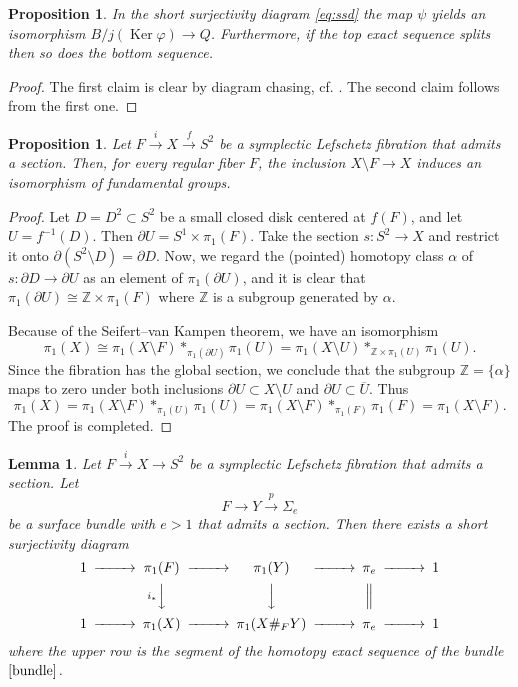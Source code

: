 \documentclass[12pt]{amsart}
\newcommand{\B}[1]{{\mathbb #1}}
\newcommand{\Z}{\B Z}
\newtheorem{lemma}[subsection]{Lemma}
\newtheorem{prop}[subsection]{Proposition}
\theoremstyle{definition}
\theoremstyle{remark}
\numberwithin{figure}{section}
\numberwithin{table}{section}
\numberwithin{equation}{section}
\newcommand{\Si}{{\Sigma}}
\newcommand{\gf}{\varphi}
\newcommand{\map}[1]{\stackrel {#1}\longrightarrow}
\newcommand\Ker{\operatorname{Ker}}
\begin{document}
\begin{prop}\label{p:ssd}
In the short surjectivity diagram \eqref{eq:ssd} the map $\psi$ yields an 
isomorphism $B/j(\Ker \gf)\to Q$. Furthermore, if the top exact sequence splits 
then so does the bottom sequence.
\end{prop}


\begin{proof} The first claim is clear by diagram chasing, cf. \cite[Lemma II.3.2]{M}. The 
second claim follows from the first one.
\end{proof}

\begin{prop}\label{p:circle}
Let $F\map{i} X \map{f} S^2$ be a symplectic Lefschetz fibration that admits a section. Then, for 
every regular fiber $F$, the inclusion $X\setminus F \to X$ induces an isomorphism of 
fundamental groups.  
\end{prop}

\begin{proof}
Let $D=D^2\subset S^2$ be a small closed disk centered at $f(F)$, and let 
$U=f^{-1}(D)$. Then $\partial U= S^1\times \pi_1(F)$. Take the section $s: S^2 \to X$ and restrict 
it onto $\partial (S^2\setminus D)=\partial D$. Now, we regard the (pointed) 
homotopy class $\alpha$ of $s: \partial D \to \partial U$ as an element of $\pi_1(\partial U)$, 
and it is clear that $\pi_1(\partial U)\cong \Z \times \pi_1(F)$ where $\Z$ is a subgroup 
generated by $\alpha$. 

Because of the Seifert--van Kampen theorem, we have an isomorphism
\[
\pi_1(X) \cong\pi_1(X\setminus F)*_{\pi_1(\partial U)}\pi_1(U)= \pi_1(X\setminus 
U)*_{\Z \times \pi_1(U)}\pi_1(U).
\]
Since the fibration has the global section, we conclude that the subgroup $\Z=\{\alpha\}$ maps to zero
under both inclusions $\partial U \subset X \setminus U$ and $\partial U \subset\overline U$. Thus
\[
\pi_1(X)=\pi_1(X\setminus F)*_{\pi_1(U)}\pi_1(U)=\pi_1(X\setminus F)*_{\pi_1(F)}\pi_1(F)=\pi_1(X\setminus F).
\]
The proof is completed.
\end{proof}

\begin{lemma}\label{L:pi1} 
Let $F \stackrel{i}\to X \to S^2$ be a symplectic Lefschetz fibration that admits a section. 
Let 
%
\begin{equation}\label{bundle}
F\to Y\stackrel{p}\to \Si_e
\end{equation}
%
be a surface bundle with $e>1$ that  admits a section. 
Then there exists a short surjectivity diagram
% 
\begin{equation*} 
\CD
1 @>>> \pi_1(F) @>>> \pi_1(Y) @>>> \pi_e @>>>  1\\ 
@. @Vi_*VV @VVV @| @. \\
1 @>>> \pi_1(X) @>>>\pi_1(X\#_F Y) @>>> \pi_e  @>>>1
\endCD
\end{equation*}
% 
where the upper row is the segment of the homotopy exact sequence of the bundle $\eqref{bundle}$.
\end{lemma} 
\end{document}
